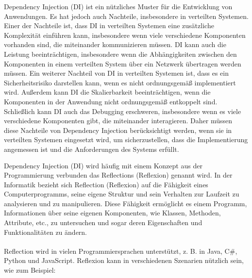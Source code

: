 Dependency Injection (DI) ist ein nützliches Muster für die Entwicklung von Anwendungen. Es hat jedoch auch Nachteile, insbesondere in verteilten Systemen. Einer der Nachteile ist, dass DI in verteilten Systemen eine zusätzliche Komplexität einführen kann, insbesondere wenn viele verschiedene Komponenten vorhanden sind, die miteinander kommunizieren müssen. DI kann auch die Leistung beeinträchtigen, insbesondere wenn die Abhängigkeiten zwischen den Komponenten in einem verteilten System über ein Netzwerk übertragen werden müssen. Ein weiterer Nachteil von DI in verteilten Systemen ist, dass es ein Sicherheitsrisiko darstellen kann, wenn es nicht ordnungsgemäß implementiert wird. Außerdem kann DI die Skalierbarkeit beeinträchtigen, wenn die Komponenten in der Anwendung nicht ordnungsgemäß entkoppelt sind. Schließlich kann DI auch das Debugging erschweren, insbesondere wenn es viele verschiedene Komponenten gibt, die miteinander interagieren. Daher müssen diese Nachteile von Dependency Injection berücksichtigt werden, wenn sie in verteilten Systemen eingesetzt wird, um sicherzustellen, dass die Implementierung angemessen ist und die Anforderungen des Systems erfüllt.

Dependency Injection (DI) wird häufig mit einem Konzept aus der Programmierung verbunden das Reflections (Reflexion) genannt wird. In der Informatik bezieht sich Reflection (Reflexion) auf die Fähigkeit eines Computerprogramms, seine eigene Struktur und sein Verhalten zur Laufzeit zu analysieren und zu manipulieren. Diese Fähigkeit ermöglicht es einem Programm, Informationen über seine eigenen Komponenten, wie Klassen, Methoden, Attribute, etc., zu untersuchen und sogar deren Eigenschaften und Funktionalitäten zu ändern.
\\\\
Reflection wird in vielen Programmiersprachen unterstützt, z. B. in Java, C\#, Python und JavaScript. Reflexion kann in verschiedenen Szenarien nützlich sein, wie zum Beispiel:

